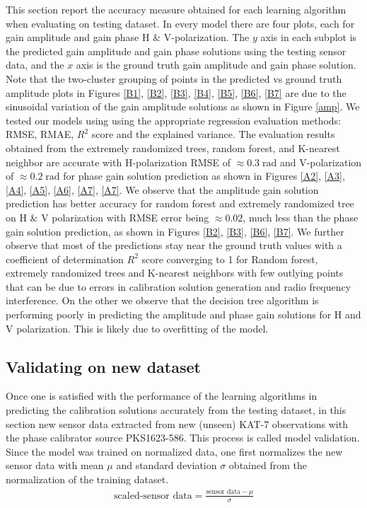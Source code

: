 This section report the accuracy measure obtained for each learning algorithm when evaluating on testing dataset. In every model there are four plots, each for gain amplitude and gain phase H $\&$ V-polarization. The $y$ axis in each subplot is the predicted gain amplitude and gain phase solutions using the testing sensor data, and the $x$ axis is the ground truth gain amplitude and gain phase solution. Note that the two-cluster grouping of points in the predicted vs ground truth amplitude plots in Figures \ref{B1}, \ref{B2}, \ref{B3}, \ref{B4}, \ref{B5}, \ref{B6}, \ref{B7} are due to the sinusoidal variation of the gain amplitude solutions as shown in Figure \ref{amp}. We tested our models using using the appropriate regression evaluation methods: RMSE, RMAE, $R^2$ score and the explained variance. The evaluation results obtained from the extremely randomized trees, random forest, and K-nearest neighbor are accurate with H-polarization RMSE of $\approx 0.3 \;\mathrm{rad}$   and V-polarization of $\approx 0.2 \;\mathrm{rad}$ for phase gain solution prediction as shown in Figures \ref{A2}, \ref{A3}, \ref{A4}, \ref{A5}, \ref{A6}, \ref{A7}, \ref{A7}. We observe that the amplitude gain solution prediction has better accuracy for random forest and extremely randomized tree on H $\&$ V polarization with RMSE error being $\approx 0.02$, much less than the phase gain solution prediction, as shown in Figures \ref{B2}, \ref{B3}, \ref{B6}, \ref{B7}. We further observe that most of the predictions stay near the ground truth values with a coefficient of determination $R^2$ score converging to 1 for Random forest, extremely randomized trees and K-nearest neighbors with few outlying points that can be due to errors in calibration solution generation and radio frequency interference. On the other we observe that the decision tree algorithm is performing poorly in predicting the amplitude and phase gain solutions for H and V polarization. This is likely due to overfitting of the model. 


\subsection{Validating on new dataset}

Once one is satisfied with the performance of the learning algorithms in predicting the calibration solutions accurately from the testing dataset, in this section new sensor data extracted from new (unseen) KAT-7 observations with the phase calibrator source PKS1623-586. This process is called model validation. Since the model was trained on normalized data, one first normalizes the new sensor data with mean $\mu$ and standard deviation $\sigma$ obtained from the normalization of the training dataset.
\begin{align}
\text{scaled-sensor data}= \frac{\text{sensor data}- \mu}{\sigma}
\end{align}

